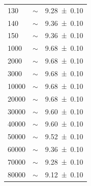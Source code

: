 \begin{center}
\begin{adjustbox}{max width=\linewidth, keepaspectratio}
\begin{tabular}{lll}
            \SI{130}{}                   & $\sim$                                             & \SI{9,28 \pm 0,10}{}                               \\
            \SI{140}{}                   & $\sim$                                             & \SI{9,36 \pm 0,10}{}                               \\
            \SI{150}{}                   & $\sim$                                             & \SI{9,36 \pm 0,10}{}                               \\
            \SI{1000}{}                  & $\sim$                                             & \SI{9,68 \pm 0,10}{}                               \\
            \SI{2000}{}                  & $\sim$                                             & \SI{9,68 \pm 0,10}{}                               \\
            \SI{3000}{}                  & $\sim$                                             & \SI{9,68 \pm 0,10}{}                               \\
            \SI{10000}{}                 & $\sim$                                             & \SI{9,68 \pm 0,10}{}                               \\
            \SI{20000}{}                 & $\sim$                                             & \SI{9,68 \pm 0,10}{}                               \\
            \SI{30000}{}                 & $\sim$                                             & \SI{9,60 \pm 0,10}{}                               \\
            \SI{40000}{}                 & $\sim$                                             & \SI{9,60 \pm 0,10}{}                               \\
            \SI{50000}{}                 & $\sim$                                             & \SI{9,52 \pm 0,10}{}                               \\
            \SI{60000}{}                 & $\sim$                                             & \SI{9,36 \pm 0,10}{}                               \\
            \SI{70000}{}                 & $\sim$                                             & \SI{9,28 \pm 0,10}{}                               \\
            \SI{80000}{}                 & $\sim$                                             & \SI{9,12 \pm 0,10}{}                               \\

\end{tabular}
\end{adjustbox}
\end{center}

